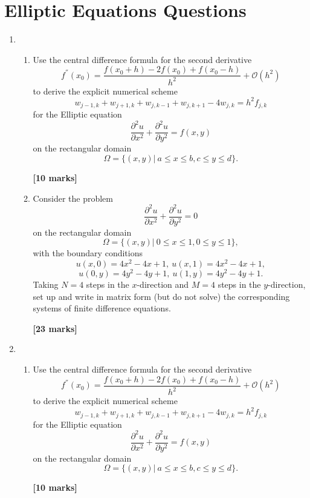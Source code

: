 \section{Elliptic Equations Questions}
\begin{enumerate}
\item
	\begin{enumerate}
	
\item 
Use the central difference formula for the second derivative 
\[ f^{''}(x_0)=\frac{f(x_0+h)-2f(x_0)+f(x_0-h)}{h^2}+\mathcal{O}(h^2)\]
to derive the explicit numerical scheme
\[w_{j-1,k}+w_{j+1,k}+w_{j,k-1}+w_{j,k+1}-4w_{j,k}=h^2f_{j,k}\]
for the Elliptic equation 
\[\frac{\partial^2 u}{\partial x^2}+\frac{\partial^2 u}{\partial y^2}=f(x,y) \]
on the rectangular domain
\[\Omega=\{(x,y)| \ a\leq x \leq b, c \leq y \leq d\}. \]
\begin{flushright}
\textbf{[10 marks]}
\end{flushright}
	
\item Consider the problem
\[\frac{\partial^2 u}{\partial x^2}+\frac{\partial^2 u}{\partial y^2}=0 \]
on the rectangular domain
\[\Omega=\{(x,y)| \ 0\leq x \leq 1, 0 \leq y \leq 1\}, \]
with the boundary conditions
\[ u(x,0)=4x^2-4x+1, \ u(x,1)=4x^2-4x+1, \] \[ u(0,y)=4y^2-4y+1, \ u(1,y)=4y^2-4y+1.   \]
Taking $N=4$ steps in the $x$-direction and $M=4$ steps in the $y$-direction, set up and write in matrix form (but do not solve) the corresponding systems of finite difference equations.
\begin{flushright}
\textbf{[23 marks]}
\end{flushright}
		
\end{enumerate}
\newpage
\item
	\begin{enumerate}
	
\item 
Use the central difference formula for the second derivative 
\[ f^{''}(x_0)=\frac{f(x_0+h)-2f(x_0)+f(x_0-h)}{h^2}+\mathcal{O}(h^2)\]
to derive the explicit numerical scheme
\[w_{j-1,k}+w_{j+1,k}+w_{j,k-1}+w_{j,k+1}-4w_{j,k}=h^2f_{j,k}\]
for the Elliptic equation 
\[\frac{\partial^2 u}{\partial x^2}+\frac{\partial^2 u}{\partial y^2}=f(x,y) \]
on the rectangular domain
\[\Omega=\{(x,y)| \ a\leq x \leq b, c \leq y \leq d\}. \]
\begin{flushright}
\textbf{[10 marks]}
\end{flushright}
	

\end{enumerate}
\end{enumerate}
